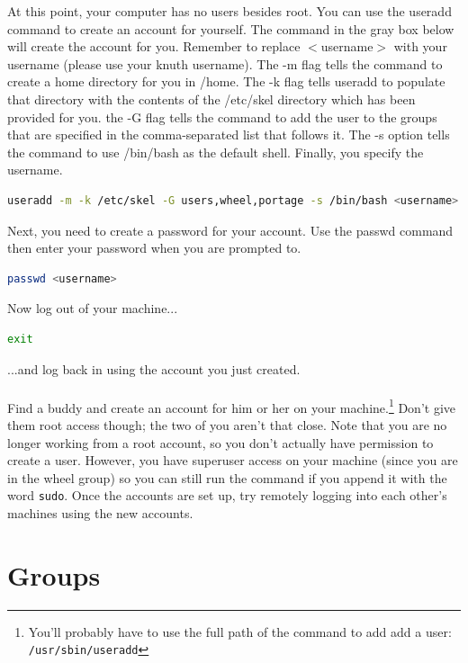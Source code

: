 \documentclass{article}
\newcommand{\sudo}{\texttt{sudo}\xspace}
\begin{document}
At this point, your computer has no users besides root. You can use the useradd
command to create an account for yourself. The command in the gray box below
will create the account for you. Remember to replace  $<$username$>$ with your
username (please use your knuth username). The -m flag tells the command to
create a home directory for you in /home. The -k flag tells useradd to populate
that directory with the contents of the /etc/skel directory which has been
provided for you. the -G flag tells the command to add the user to the groups
that are specified in the comma-separated list that follows it. The -s option
tells the command to use /bin/bash as the default shell. Finally, you specify
the username.

\begin{lstlisting}[language = bash]
useradd -m -k /etc/skel -G users,wheel,portage -s /bin/bash <username>
\end{lstlisting}

Next, you need to create a password for your account. Use the passwd command
then enter your password when you are prompted to.

\begin{lstlisting}[language = bash]
passwd <username>
\end{lstlisting}

Now log out of your machine...

\begin{lstlisting}[language = bash]
exit
\end{lstlisting}

...and log back in using the account you just created. \\\\

Find a buddy and create an account for him or her on your machine.\footnote{You'll 
probably have to use the full path of the command to add add a user: 
\texttt{/usr/sbin/useradd}} Don't give
them root access though; the two of you aren't that close. Note that you are no
longer working from a root account, so you don't actually have permission to
create a user. However, you have superuser access on your machine (since you are
in the wheel group) so you can still run the command if you append it with the
word \sudo. Once the accounts are set up, try remotely logging into each other's machines
using the new accounts.

\section*{Groups}
\end{document}
